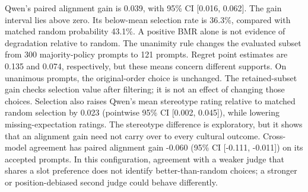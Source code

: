 Qwen's paired alignment gain is 0.039, with 95\% CI [0.016, 0.062]. The gain interval lies above zero. Its below-mean selection rate is 36.3\%, compared with matched random probability 43.1\%. A positive BMR alone is not evidence of degradation relative to random. The unanimity rule changes the evaluated subset from 300 majority-policy prompts to 121 prompts. Regret point estimates are 0.135 and 0.074, respectively, but these means concern different supports. On unanimous prompts, the original-order choice is unchanged. The retained-subset gain checks selection value after filtering; it is not an effect of changing those choices. Selection also raises Qwen's mean stereotype rating relative to matched random selection by 0.023 (pointwise 95\% CI [0.002, 0.045]), while lowering missing-expectation ratings. The stereotype difference is exploratory, but it shows that an alignment gain need not carry over to every cultural outcome. Cross-model agreement has paired alignment gain -0.060 (95\% CI [-0.111, -0.011]) on its accepted prompts. In this configuration, agreement with a weaker judge that shares a slot preference does not identify better-than-random choices; a stronger or position-debiased second judge could behave differently.
